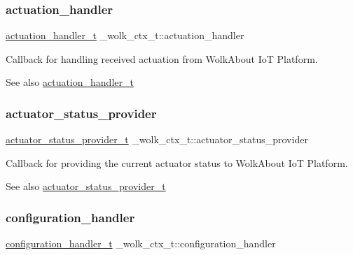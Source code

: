 \subsubsection{\texorpdfstring{actuation\+\_\+handler}{actuation\_handler}}
{\footnotesize\ttfamily \hyperlink{WolkConn_8h_acde87869e807b1774680f3f2b5b04e2f}{actuation\+\_\+handler\+\_\+t} \+\_\+wolk\+\_\+ctx\+\_\+t\+::actuation\+\_\+handler}

Callback for handling received actuation from Wolk\+About IoT Platform. \begin{DoxySeeAlso}{See also}
\hyperlink{WolkConn_8h_acde87869e807b1774680f3f2b5b04e2f}{actuation\+\_\+handler\+\_\+t} 
\end{DoxySeeAlso}
\mbox{\label{struct__wolk__ctx__t_aadae34ca3e3d99ed0e124ffd610f1edd}} 
\subsubsection{\texorpdfstring{actuator\+\_\+status\+\_\+provider}{actuator\_status\_provider}}
{\footnotesize\ttfamily \hyperlink{WolkConn_8h_af3e8919a04a293972b64605557287537}{actuator\+\_\+status\+\_\+provider\+\_\+t} \+\_\+wolk\+\_\+ctx\+\_\+t\+::actuator\+\_\+status\+\_\+provider}

Callback for providing the current actuator status to Wolk\+About IoT Platform. \begin{DoxySeeAlso}{See also}
\hyperlink{WolkConn_8h_af3e8919a04a293972b64605557287537}{actuator\+\_\+status\+\_\+provider\+\_\+t} 
\end{DoxySeeAlso}
\mbox{\label{struct__wolk__ctx__t_a4d17880aa8086559923d94f678cecfbc}} 
\subsubsection{\texorpdfstring{configuration\+\_\+handler}{configuration\_handler}}
{\footnotesize\ttfamily \hyperlink{WolkConn_8h_a6662d0d41546795466cc2b398d8dcb08}{configuration\+\_\+handler\+\_\+t} \+\_\+wolk\+\_\+ctx\+\_\+t\+::configuration\+\_\+handler}


